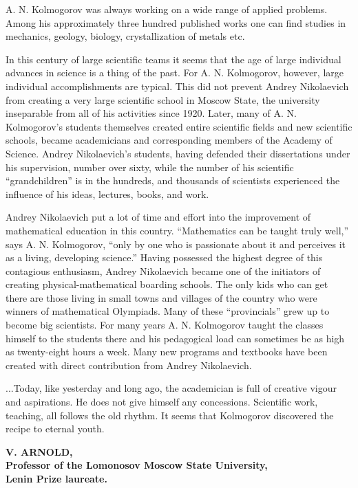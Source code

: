 \documentclass{article}
\begin{document}
A. N. Kolmogorov was always working on a wide range of applied problems.
Among his approximately three hundred published works one can find studies in mechanics, geology, biology, crystallization of metals etc.

In this century of large scientific teams it seems that the age of large individual advances in science is a thing of the past.
For A. N. Kolmogorov, however, large individual accomplishments are typical.
This did not prevent Andrey Nikolaevich from creating a very large scientific school in Moscow State, the university inseparable from all of his activities since 1920.
Later, many of A. N. Kolmogorov's students themselves created entire scientific fields and new scientific schools, became academicians and corresponding members of the Academy of Science.
Andrey Nikolaevich's students, having defended their dissertations under his supervision, number over sixty, while the number of his scientific ``grandchildren'' is in the hundreds, and thousands of scientists experienced the influence of his ideas, lectures, books, and work.

Andrey Nikolaevich put a lot of time and effort into the improvement of mathematical education in this country.
``Mathematics can be taught truly well,'' says A. N. Kolmogorov, ``only by one who is passionate about it and perceives it as a living, developing science.''
Having possessed the highest degree of this contagious enthusiasm, Andrey Nikolaevich became one of the initiators of creating physical-mathematical boarding schools.
The only kids who can get there are those living in small towns and villages of the country who were winners of mathematical Olympiads.
Many of these ``provincials'' grew up to become big scientists.
For many years A. N. Kolmogorov taught the classes himself to the students there and his pedagogical load can sometimes be as high as twenty-eight hours a week.
Many new programs and textbooks have been created with direct contribution from Andrey Nikolaevich.

...Today, like yesterday and long ago, the academician is full of creative vigour and aspirations.
He does not give himself any concessions.
Scientific work, teaching, all follows the old rhythm.
It seems that Kolmogorov discovered the recipe to eternal youth.

\begin{flushright}
\textbf{V. ARNOLD,\\Professor of the Lomonosov Moscow State University,\\Lenin Prize laureate.}
\end{flushright}
\end{document}
